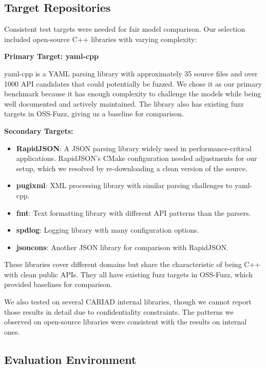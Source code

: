 \subsection{Target Repositories}

Consistent test targets were needed for fair model comparison. Our selection included open-source C++ libraries with varying complexity:

\textbf{Primary Target: yaml-cpp}

yaml-cpp is a YAML parsing library with approximately 35 source files and over 1000 API candidates that could potentially be fuzzed. We chose it as our primary benchmark because it has enough complexity to challenge the models while being well documented and actively maintained. The library also has existing fuzz targets in OSS-Fuzz, giving us a baseline for comparison.

\textbf{Secondary Targets:}
\begin{itemize}
    \item \textbf{RapidJSON}: A JSON parsing library widely used in performance-critical applications. RapidJSON's CMake configuration needed adjustments for our setup, which we resolved by re-downloading a clean version of the source.
    \item \textbf{pugixml}: XML processing library with similar parsing challenges to yaml-cpp.
    \item \textbf{fmt}: Text formatting library with different API patterns than the parsers.
    \item \textbf{spdlog}: Logging library with many configuration options.
    \item \textbf{jsoncons}: Another JSON library for comparison with RapidJSON.
\end{itemize}

These libraries cover different domains but share the characteristic of being C++ with clean public APIs. They all have existing fuzz targets in OSS-Fuzz, which provided baselines for comparison.

We also tested on several CARIAD internal libraries, though we cannot report those results in detail due to confidentiality constraints. The patterns we observed on open-source libraries were consistent with the results on internal ones.

\subsection{Evaluation Environment}

